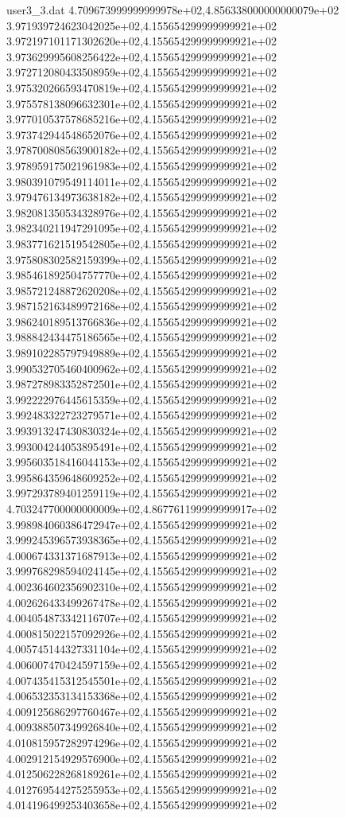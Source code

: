 \begin{filecontents}{user3_3.dat}
4.709673999999999978e+02,4.856338000000000079e+02
3.971939724623042025e+02,4.155654299999999921e+02
3.972197101171302620e+02,4.155654299999999921e+02
3.973629995608256422e+02,4.155654299999999921e+02
3.972712080433508959e+02,4.155654299999999921e+02
3.975320266593470819e+02,4.155654299999999921e+02
3.975578138096632301e+02,4.155654299999999921e+02
3.977010537578685216e+02,4.155654299999999921e+02
3.973742944548652076e+02,4.155654299999999921e+02
3.978700808563900182e+02,4.155654299999999921e+02
3.978959175021961983e+02,4.155654299999999921e+02
3.980391079549114011e+02,4.155654299999999921e+02
3.979476134973638182e+02,4.155654299999999921e+02
3.982081350534328976e+02,4.155654299999999921e+02
3.982340211947291095e+02,4.155654299999999921e+02
3.983771621519542805e+02,4.155654299999999921e+02
3.975808302582159399e+02,4.155654299999999921e+02
3.985461892504757770e+02,4.155654299999999921e+02
3.985721248872620208e+02,4.155654299999999921e+02
3.987152163489972168e+02,4.155654299999999921e+02
3.986240189513766836e+02,4.155654299999999921e+02
3.988842434475186565e+02,4.155654299999999921e+02
3.989102285797949889e+02,4.155654299999999921e+02
3.990532705460400962e+02,4.155654299999999921e+02
3.987278983352872501e+02,4.155654299999999921e+02
3.992222976445615359e+02,4.155654299999999921e+02
3.992483322723279571e+02,4.155654299999999921e+02
3.993913247430830324e+02,4.155654299999999921e+02
3.993004244053895491e+02,4.155654299999999921e+02
3.995603518416044153e+02,4.155654299999999921e+02
3.995864359648609252e+02,4.155654299999999921e+02
3.997293789401259119e+02,4.155654299999999921e+02
4.703247700000000009e+02,4.867761199999999917e+02
3.998984060386472947e+02,4.155654299999999921e+02
3.999245396573938365e+02,4.155654299999999921e+02
4.000674331371687913e+02,4.155654299999999921e+02
3.999768298594024145e+02,4.155654299999999921e+02
4.002364602356902310e+02,4.155654299999999921e+02
4.002626433499267478e+02,4.155654299999999921e+02
4.004054873342116707e+02,4.155654299999999921e+02
4.000815022157092926e+02,4.155654299999999921e+02
4.005745144327331104e+02,4.155654299999999921e+02
4.006007470424597159e+02,4.155654299999999921e+02
4.007435415312545501e+02,4.155654299999999921e+02
4.006532353134153368e+02,4.155654299999999921e+02
4.009125686297760467e+02,4.155654299999999921e+02
4.009388507349926840e+02,4.155654299999999921e+02
4.010815957282974296e+02,4.155654299999999921e+02
4.002912154929576900e+02,4.155654299999999921e+02
4.012506228268189261e+02,4.155654299999999921e+02
4.012769544275255953e+02,4.155654299999999921e+02
4.014196499253403658e+02,4.155654299999999921e+02

\end{filecontents}
